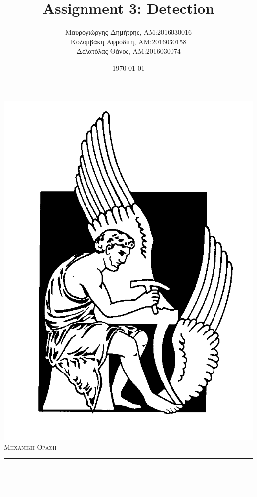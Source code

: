 \documentclass{article}
\newcommand{\tl}[1]{\textlatin{#1}}
\begin{document}
	\greektext
	\title{\tl{Assignment 3: Detection}}						%
	\author{Μαυρογιώργης Δημήτρης, AM:2016030016\\Κολομβάκη Αφροδίτη, AM:2016030158\\Δελατόλας Θάνος, AM:2016030074}								%
	\date{\today}											%
	
	\makeatletter
	\let\thetitle\@title
	\let\theauthor\@author
	\let\thedate\@date
	\makeatother
	
	
	
	\begin{titlepage}
		\centering
		\vspace*{0.5 cm}
		\includegraphics[scale = 0.4]{../../Assignment 1/report/polytexneio-logo.png}\\[1.0 cm]	%
		\textsc{\LARGE Μηχανικη Όραση }\\[2.0 cm]	
		\rule{\linewidth}{0.2 mm} \\[0.4 cm]
		{ \huge \bfseries \thetitle}\\
		\rule{\linewidth}{0.2 mm} \\[1.5 cm]
		

\end{titlepage}
\end{document}
